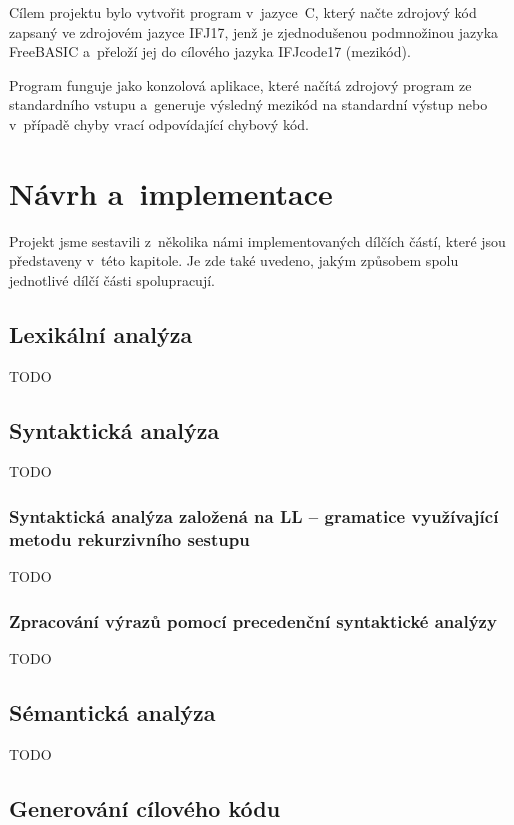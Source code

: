 \documentclass[a4paper, 11pt]{article}
\begin{document}
	Cílem projektu bylo vytvořit program v~jazyce~C, který načte zdrojový kód zapsaný ve zdrojovém jazyce IFJ17,
	jenž je zjednodušenou podmnožinou jazyka FreeBASIC a~přeloží jej do cílového jazyka IFJcode17 (mezikód).

	Program funguje jako konzolová aplikace, které načítá zdrojový program ze standardního vstupu a~generuje
	výsledný mezikód na standardní výstup nebo v~případě chyby vrací odpovídající chybový kód.


	\section{Návrh a~implementace}

	Projekt jsme sestavili z~několika námi implementovaných dílčích částí, které jsou představeny v~této kapitole.
	Je zde také uvedeno, jakým způsobem spolu jednotlivé dílčí části spolupracují.


	\subsection{Lexikální analýza}

	TODO


	\subsection{Syntaktická analýza}

	TODO

	\subsubsection{Syntaktická analýza založená na LL -- gramatice využívající metodu rekurzivního sestupu}

	TODO

	\subsubsection{Zpracování výrazů pomocí precedenční syntaktické analýzy}

	TODO


	\subsection{Sémantická analýza}

	TODO


	\subsection{Generování cílového kódu}
\end{document}
